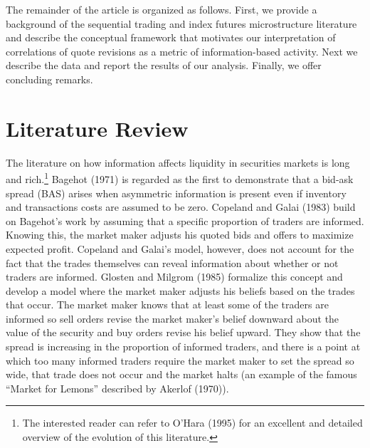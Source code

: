 \documentclass[review,12pt]{elsarticle}
\begin{document}
\begin{linenumbers}
The remainder of the article is organized as follows. First, we provide
a background of the sequential trading and index futures microstructure
literature and describe the conceptual framework that motivates our
interpretation of correlations of quote revisions as a metric of
information-based activity. Next we describe the data and report the
results of our analysis. Finally, we offer concluding remarks.

\section{Literature Review}\label{literature-review}

The literature on how information affects liquidity in securities
markets is long and rich.\footnote{The interested reader can refer to
  O'Hara (1995) for an excellent and detailed overview of the evolution
  of this literature.} Bagehot (1971) is regarded as the first to
demonstrate that a bid-ask spread (BAS) arises when asymmetric
information is present even if inventory and transactions costs are
assumed to be zero. Copeland and Galai (1983) build on Bagehot's work by
assuming that a specific proportion of traders are informed. Knowing
this, the market maker adjusts his quoted bids and offers to maximize
expected profit. Copeland and Galai's model, however, does not account
for the fact that the trades themselves can reveal information about
whether or not traders are informed. Glosten and Milgrom (1985)
formalize this concept and develop a model where the market maker
adjusts his beliefs based on the trades that occur. The market maker
knows that at least some of the traders are informed so sell orders
revise the market maker's belief downward about the value of the
security and buy orders revise his belief upward. They show that the
spread is increasing in the proportion of informed traders, and there is
a point at which too many informed traders require the market maker to
set the spread so wide, that trade does not occur and the market halts
(an example of the famous ``Market for Lemons'' described by Akerlof
(1970)).


\end{linenumbers}
\end{document}
